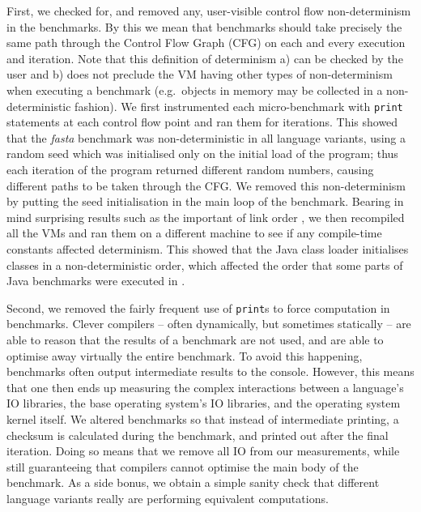 \documentclass[10pt,preprint]{sigplanconf}
\newcommand{\fasta}{\emph{fasta}\xspace}
\begin{document}
First, we checked for, and removed any, user-visible control flow
non-determinism in the benchmarks. By this we mean that benchmarks should take
precisely the same path through the Control Flow Graph (CFG) on each and every
execution and iteration. Note that
this definition of determinism a) can be checked by the user and b) does not
preclude the VM having other types of non-determinism when executing a benchmark
(e.g.~objects in memory may be collected in a non-deterministic fashion). We
first instrumented each micro-benchmark with \texttt{print} statements at each
control flow point and ran them for  iterations. This showed that
the \fasta benchmark was non-deterministic in all language variants, using a random seed which was
initialised only on the initial load of the program; thus each iteration of the
program returned different random numbers, causing different paths to be taken
through the CFG. We removed this non-determinism by putting the seed
initialisation in the main loop of the benchmark. Bearing in mind surprising
results such as the important of link order \cite{mytkowicz09surprising}, we
then recompiled all the VMs and ran them on a different machine to see if any
compile-time constants affected determinism.  This showed that the Java class loader
initialises classes in a non-deterministic order, which affected the order that
some parts of Java benchmarks were executed in  . 

 Second, we removed the fairly frequent use of
\texttt{print}s to force computation in benchmarks. Clever compilers -- often
dynamically, but sometimes statically -- are able to reason that the results of
a benchmark are not used, and are able to optimise away virtually the entire
benchmark. To avoid this happening, benchmarks often output intermediate results
to the console. However, this means that one then ends up measuring the complex
interactions between a language's IO libraries, the base operating system's IO
libraries, and the operating system kernel itself. We altered  benchmarks so that instead of intermediate printing, a checksum is
calculated during the benchmark, and printed out after the final iteration.
Doing so means that we remove all IO from our measurements, while still
guaranteeing that compilers cannot optimise the main body of the benchmark. As a
side bonus, we obtain a simple sanity check that different language variants
really are performing equivalent computations.
\end{document}
